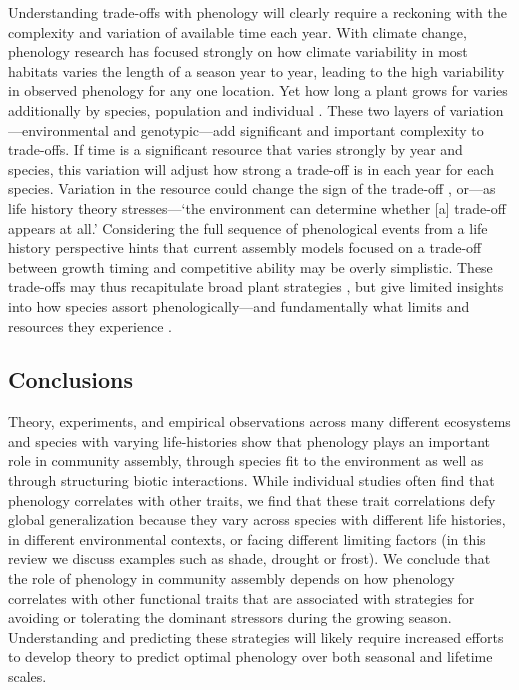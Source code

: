 \documentclass[11pt]{article}
\begin{document}
Understanding trade-offs with phenology will clearly require a reckoning with the complexity and variation of available time each year. With climate change, phenology research has focused strongly on how climate variability in most habitats varies the length of a season year to year, leading to the high variability in observed phenology for any one location. Yet how long a plant grows for varies additionally by species, population and individual \citep{ettinger2018phenological,korner2023four}. These two layers of variation---environmental and genotypic---add significant and important complexity to trade-offs. If time is a significant resource that varies strongly by year and species, this variation will adjust how strong a trade-off is in each year for each species. Variation in the resource could change the sign of the trade-off \citep{van1986acquisition}, or---as life history theory stresses---`the environment can determine whether [a] trade-off appears at all.' Considering the full sequence of phenological events from a life history perspective hints that current assembly models focused on a trade-off between growth timing and competitive ability may be overly simplistic. These trade-offs may thus recapitulate broad plant strategies \citep{grime1977evidence}, but give limited insights into how species assort phenologically---and fundamentally what limits and resources they experience \citep{stanton2000}. 

\subsection*{Conclusions}

Theory, experiments, and empirical observations across many different ecosystems and species with varying life-histories show that phenology plays an important role in community assembly, through species fit to the environment as well as through structuring biotic interactions. While individual studies often find that phenology correlates with other traits, we find that these trait correlations defy global generalization because they vary across species with different life histories, in different environmental contexts, or facing different limiting factors (in this review we discuss examples such as shade, drought or frost). We conclude that the role of phenology in community assembly depends on how phenology correlates with other functional traits that are associated with strategies for avoiding or tolerating the dominant stressors during the growing season. Understanding and predicting these strategies will likely require increased efforts to develop theory to predict optimal phenology over both seasonal and lifetime scales.\\
\end{document}
